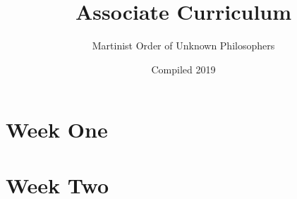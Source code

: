 \documentclass[]{book}
\title{Associate Curriculum}
\author{Martinist Order of Unknown Philosophers}
\date{Compiled 2019}
\begin{document}
	\maketitle
	\tableofcontents
	\chapter{Week One}
	
	\chapter{Week Two}
	
\end{document}

